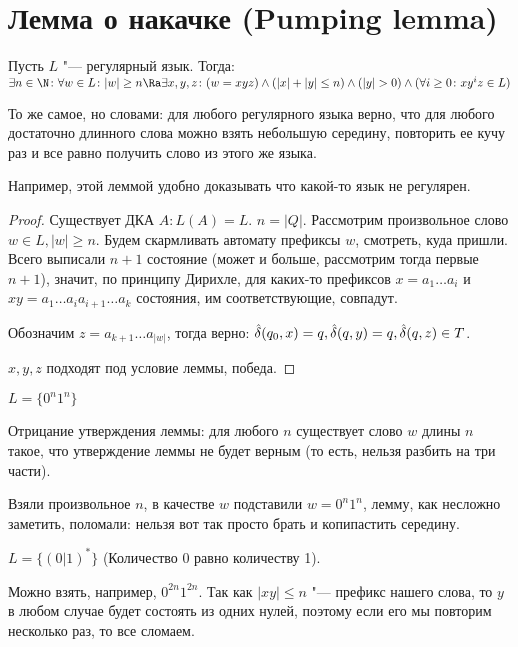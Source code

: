 \section{Лемма о накачке (Pumping lemma)}
\begin{theorem}
Пусть $L$ "--- регулярный язык. Тогда: $\exists n \in \N \colon \forall w \in L \colon |w| \geq n \Ra \exists x, y, z \colon (w=xyz) \land (|x| + |y| \leq n) \land (|y| > 0) \land (\forall i \geq 0\colon xy^iz \in L)$ 

То же самое, но словами: для любого регулярного языка верно, что для любого достаточно длинного слова можно взять небольшую середину, повторить ее кучу раз и все равно получить слово из этого же языка.

Например, этой леммой удобно доказывать что какой-то язык не регулярен.
\end{theorem}
\begin{proof}
Существует ДКА $A \colon L(A) = L$. $n = |Q|$. Рассмотрим произвольное слово $w \in L, |w| \geq n$.
Будем скармливать автомату префиксы $w$, смотреть, куда пришли. Всего выписали $n+1$ состояние (может и больше, рассмотрим тогда первые $n + 1$), значит, 
по принципу Дирихле, для каких-то префиксов $x = a_1 \dots a_i$ и $xy = a_1 \dots a_ia_{i+1} \dots a_k$ состояния, им соответствующие, совпадут.

Обозначим $z = a_{k+1}\dots a_{|w|}$, тогда верно: 
$\\
\hat\delta(q_0, x) = q,\\ 
\hat\delta(q, y) = q,\\
\hat\delta(q, z) \in T$.

$x, y, z$ подходят под условие леммы, победа.

\end{proof}              
\begin{exmp}
$L = \{0^n1^n\}$

Отрицание утверждения леммы: для любого $n$ существует слово $w$ длины $n$ такое, что утверждение леммы не будет верным (то есть, нельзя разбить на три части).


Взяли произвольное $n$, в качестве $w$ подставили $w=0^n1^n$, лемму, как несложно заметить, поломали: нельзя вот так просто брать и копипастить середину.
\end{exmp}
\begin{exmp}
$L = \{(0|1)^*\}$ (Количество 0 равно количеству 1).

Можно взять, например, $0^{2n}1^{2n}$. Так как $|xy| \leq n$ "--- префикс нашего слова, то $y$ в любом случае будет состоять из одних нулей, поэтому если его мы повторим несколько раз, то все сломаем.
\end{exmp}
